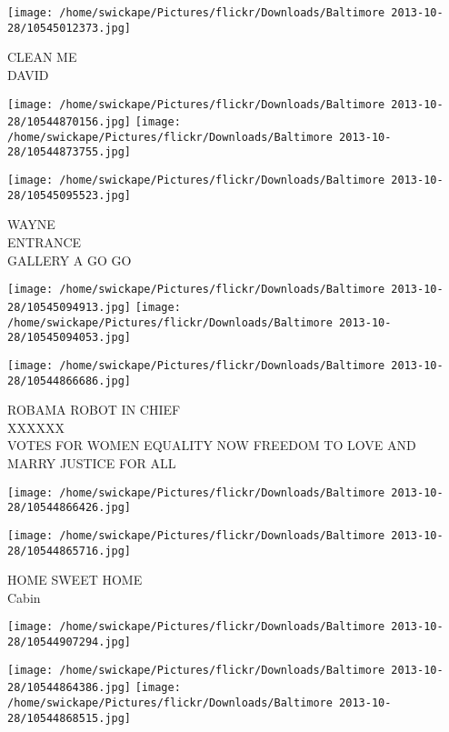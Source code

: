 \documentclass[10pt,letterpaper]{article}
\begin{document}
\vspace{0.25in}
\texttt{[image: /home/swickape/Pictures/flickr/Downloads/Baltimore 2013-10-28/10545012373.jpg]}

CLEAN ME\\
DAVID\\
\pagebreak

\texttt{[image: /home/swickape/Pictures/flickr/Downloads/Baltimore 2013-10-28/10544870156.jpg]}
\texttt{[image: /home/swickape/Pictures/flickr/Downloads/Baltimore 2013-10-28/10544873755.jpg]}

\vspace{0.25in}
\texttt{[image: /home/swickape/Pictures/flickr/Downloads/Baltimore 2013-10-28/10545095523.jpg]}

WAYNE\\
ENTRANCE\\
GALLERY A GO GO\\
\pagebreak

\texttt{[image: /home/swickape/Pictures/flickr/Downloads/Baltimore 2013-10-28/10545094913.jpg]}
\texttt{[image: /home/swickape/Pictures/flickr/Downloads/Baltimore 2013-10-28/10545094053.jpg]}

\vspace{0.25in}
\texttt{[image: /home/swickape/Pictures/flickr/Downloads/Baltimore 2013-10-28/10544866686.jpg]}

ROBAMA ROBOT IN CHIEF\\
XXXXXX\\
VOTES FOR WOMEN EQUALITY NOW FREEDOM TO LOVE AND MARRY JUSTICE FOR ALL\\
\pagebreak

\texttt{[image: /home/swickape/Pictures/flickr/Downloads/Baltimore 2013-10-28/10544866426.jpg]}

\vspace{0.25in}
\texttt{[image: /home/swickape/Pictures/flickr/Downloads/Baltimore 2013-10-28/10544865716.jpg]}

HOME SWEET HOME\\
Cabin\\
\pagebreak

\texttt{[image: /home/swickape/Pictures/flickr/Downloads/Baltimore 2013-10-28/10544907294.jpg]}

\vspace{0.25in}
\texttt{[image: /home/swickape/Pictures/flickr/Downloads/Baltimore 2013-10-28/10544864386.jpg]}
\texttt{[image: /home/swickape/Pictures/flickr/Downloads/Baltimore 2013-10-28/10544868515.jpg]}
\end{document}
